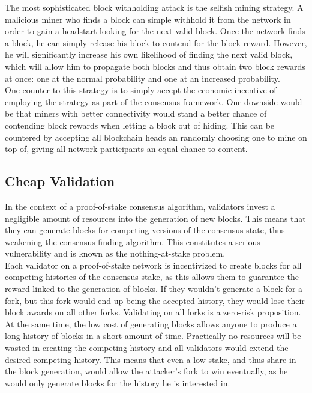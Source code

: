 \documentclass[11pt,a4paper,draft]{article}
\begin{document}
The most sophisticated block withholding attack is the selfish mining strategy. A malicious miner who finds a block can simple withhold it from the network in order to gain a headstart looking for the next valid block. Once the network finds a block, he can simply release his block to contend for the block reward. However, he will significantly increase his own likelihood of finding the next valid block, which will allow him to propagate both blocks and thus obtain two block rewards at once: one at the normal probability and one at an increased probability.\\

One counter to this strategy is to simply accept the economic incentive of employing the strategy as part of the consensus framework. One downside would be that miners with better connectivity would stand a better chance of contending block rewards when letting a block out of hiding. This can be countered by accepting all blockchain heads an randomly choosing one to mine on top of, giving all network participants an equal chance to content.\\

\subsection{Cheap Validation}

In the context of a proof-of-stake consensus algorithm, validators invest a negligible amount of resources into the generation of new blocks. This means that they can generate blocks for competing versions of the consensus state, thus weakening the consensus finding algorithm. This constitutes a serious vulnerability and is known as the nothing-at-stake problem.\\

Each validator on a proof-of-stake network is incentivized to create blocks for all competing histories of the consensus stake, as this allows them to guarantee the reward linked to the generation of blocks. If they wouldn't generate a block for a fork, but this fork would end up being the accepted history, they would lose their block awards on all other forks. Validating on all forks is a zero-risk proposition.\\

At the same time, the low cost of generating blocks allows anyone to produce a long history of blocks in a short amount of time. Practically no resources will be wasted in creating the competing history and all validators would extend the desired competing history. This means that even a low stake, and thus share in the block generation, would allow the attacker's fork to win eventually, as he would only generate blocks for the history he is interested in.\\
\end{document}
